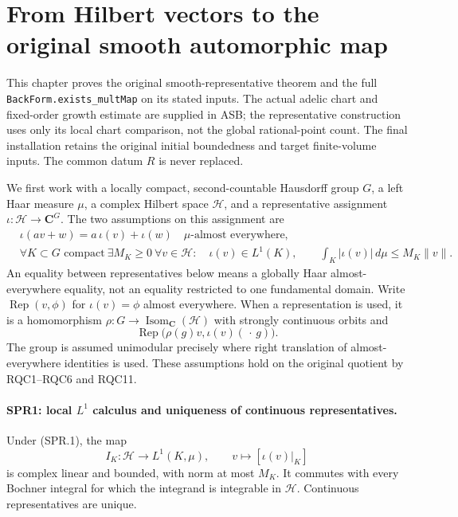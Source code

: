 \documentclass[11pt,a4paper]{article}
\numberwithin{equation}{section}
\theoremstyle{remark}\newtheorem{remark}[theorem]{Remark}
\begin{document}
\section{From Hilbert vectors to the original smooth automorphic map}
\label{sec:smooth-representatives}

This chapter proves the original smooth-representative theorem and the
full \texttt{BackForm.\allowbreak exists\_\allowbreak multMap} on its stated inputs.  The
actual adelic chart and fixed-order growth estimate are supplied in
ASB; the representative construction uses only its local chart
comparison, not the global rational-point count.
The final installation retains the original initial boundedness and
target finite-volume inputs.  The common datum \(R\) is never replaced.

We first work with a locally compact, second-countable Hausdorff group
\(G\), a left Haar measure \(\mu\), a complex Hilbert space
\(\mathcal H\), and a representative assignment
\(\iota:\mathcal H\to\mathbf C^G\).
The two assumptions on this assignment are
\[
\begin{split}
 &\iota(av+w)=a\,\iota(v)+\iota(w)\quad\mu\text{-almost everywhere},\\
 &\forall K\subset G\text{ compact}\ \exists M_K\ge0\
   \forall v\in\mathcal H:\quad
   \iota(v)\in L^1(K),\qquad
   \int_K|\iota(v)|\,d\mu\le M_K\|v\|.
\end{split}
\tag{SPR.1}
\]
An equality between representatives below means a globally Haar
almost-everywhere equality, not an equality restricted to one
fundamental domain.  Write
\(\operatorname{Rep}(v,\phi)\) for
\(\iota(v)=\phi\) almost everywhere.
When a representation is used, it is a homomorphism
\(\rho:G\to\operatorname{Isom}_{\mathbf C}(\mathcal H)\) with
strongly continuous orbits and
\[
 \operatorname{Rep}\bigl(\rho(g)v,\iota(v)(\,\cdot\,g)\bigr).
 \tag{SPR.2}
\]
The group is assumed unimodular precisely where right translation of
almost-everywhere identities is used.  These assumptions hold on the
original quotient by RQC1--RQC6 and RQC11.

\paragraph{SPR1: local \(L^1\) calculus and uniqueness of continuous representatives.}
\label{claim:SPR1}
Under (SPR.1), the map
\[
 I_K:\mathcal H\longrightarrow L^1(K,\mu),\qquad
               v\longmapsto[\iota(v)|_K]
 \tag{SPR.3}
\]
is complex linear and bounded, with norm at most \(M_K\).
It commutes with every Bochner integral for which the integrand is
integrable in \(\mathcal H\).  Continuous representatives are unique.
\end{document}
